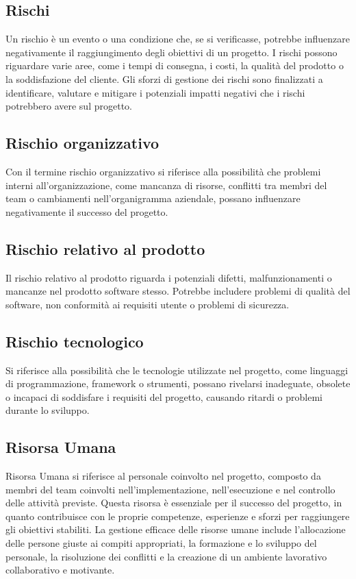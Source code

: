 \subsection*{Rischi} 
Un rischio è un evento o una condizione che, se si verificasse, potrebbe influenzare negativamente il raggiungimento degli obiettivi di un progetto. I rischi possono riguardare varie aree, come i tempi di consegna, i costi, la qualità del prodotto o la soddisfazione del cliente. Gli sforzi di gestione dei rischi sono finalizzati a identificare, valutare e mitigare i potenziali impatti negativi che i rischi potrebbero avere sul progetto. 
\subsection*{Rischio organizzativo} 
Con il termine rischio organizzativo si riferisce alla possibilità che problemi interni all'organizzazione, come mancanza di risorse, conflitti tra membri del team o cambiamenti nell'organigramma aziendale, possano influenzare negativamente il successo del progetto.
\subsection*{Rischio relativo al prodotto} 
Il rischio relativo al prodotto riguarda i potenziali difetti, malfunzionamenti o mancanze nel prodotto software stesso. Potrebbe includere problemi di qualità del software, non conformità ai requisiti utente o problemi di sicurezza.
\subsection*{Rischio tecnologico} 
Si riferisce alla possibilità che le tecnologie utilizzate nel progetto, come linguaggi di programmazione, framework o strumenti, possano rivelarsi inadeguate, obsolete o incapaci di soddisfare i requisiti del progetto, causando ritardi o problemi durante lo sviluppo.
\subsection*{Risorsa Umana} 
Risorsa Umana si riferisce al personale coinvolto nel progetto, composto da membri del team coinvolti nell'implementazione, nell'esecuzione e nel controllo delle attività previste. Questa risorsa è essenziale per il successo del progetto, in quanto contribuisce con le proprie competenze, esperienze e sforzi per raggiungere gli obiettivi stabiliti. La gestione efficace delle risorse umane include l'allocazione delle persone giuste ai compiti appropriati, la formazione e lo sviluppo del personale, la risoluzione dei conflitti e la creazione di un ambiente lavorativo collaborativo e motivante. 
